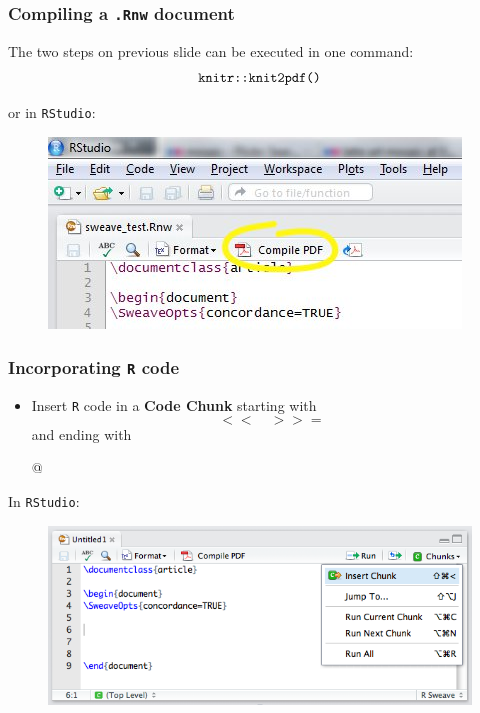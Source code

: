 \documentclass[10pt]{beamer}\usepackage[]{graphicx}\usepackage[]{color}
\begin{document}
\begin{frame}\frametitle{Compiling a \texttt{.Rnw} document}

\begin{block}{The two steps on previous slide can be executed in one command:}
\[ \textrm{\texttt{knitr::knit2pdf()}} \]
\end{block}

or in \texttt{RStudio}:
\begin{figure}[h!]
\centering
\includegraphics[scale=0.5, keepaspectratio]{./Compile-pdf.jpg}
\end{figure}
\end{frame}

\begin{frame}\frametitle{Incorporating \texttt{R} code}

\begin{itemize}
\item Insert \texttt{R} code in a \textbf{Code Chunk} starting with $$ << \quad >>= $$
and ending with \begin{center}
{@}
\end{center}
\end{itemize}

In \texttt{RStudio}:
\begin{figure}[h!]
\centering
\includegraphics[scale=0.35, keepaspectratio]{./sweave_chunk}
\end{figure}
\end{frame}
\end{document}
